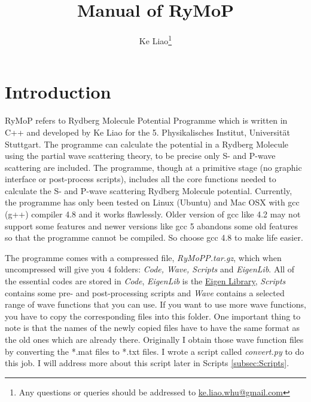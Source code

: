 \documentclass[british,english]{article}
\numberwithin{equation}{section}
\numberwithin{figure}{section}
\begin{document}
\title{Manual of RyMoP }

\author{Ke Liao\thanks{Any questions or queries should be addressed to \protect\href{mailto:ke.liao.whu@gmail.com}{ke.liao.whu@gmail.com}}}

\maketitle
\tableofcontents{}

\newpage

\section{Introduction}

RyMoP refers to Rydberg Molecule Potential \foreignlanguage{british}{Program}me
which is written in C++ and developed by Ke Liao for the 5. Physikalisches
Institut, Universit\"at Stuttgart. The programme can calculate the
potential in a Rydberg Molecule using the partial wave scattering
theory, to be precise only S- and P-wave scattering are included.
The programme, though at a primitive stage (no graphic interface or
post-process scripts), includes all the core functions needed to calculate
the S- and P-wave scattering Rydberg Molecule potential. Currently,
the programme has only been tested on Linux (Ubuntu) and Mac OSX with
gcc (g++) compiler 4.8 and it works flawlessly. Older version of gcc
like 4.2 may not support some features and newer versions like gcc
5 abandons some old features so that the programme cannot be compiled.
So choose gcc 4.8 to make life easier.

The programme comes with a compressed file, \emph{RyMoPP.tar.gz},
which when uncompressed will give you 4 folders: \emph{Code, Wave,
Scripts }and \emph{EigenLib}. All of the essential codes are stored
in \emph{Code}, \emph{EigenLib }is the \href{http://eigen.tuxfamily.org/index.php?title=Main_Page}{Eigen Library},
\emph{Scripts }contains some pre- and post-processing scripts and
\emph{Wave }contains a selected range of wave functions that you can
use. If you want to use more wave functions, you have to copy the
corresponding files into this folder. One important thing to note
is that the names of the newly copied files have to have the same
format as the old ones which are already there. Originally I obtain
those wave function files by converting the {*}.mat files to {*}.txt
files. I wrote a script called \emph{convert.py} to do this job. I
will address more about this script later in Scripts \ref{subsec:Scripts}. 
\end{document}
